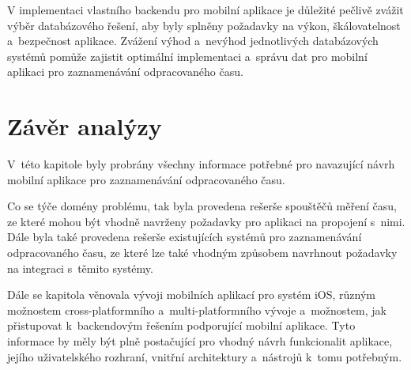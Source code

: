V implementaci vlastního backendu pro mobilní aplikace je důležité pečlivě zvážit výběr databázového řešení, aby byly splněny požadavky na výkon, škálovatelnost a~bezpečnost aplikace. Zvážení výhod a~nevýhod jednotlivých databázových systémů pomůže zajistit optimální implementaci a~správu dat pro mobilní aplikaci pro zaznamenávání odpracovaného času.

\section{Závěr analýzy}

V~této kapitole byly probrány všechny informace potřebné pro navazující návrh mobilní aplikace pro zaznamenávání odpracovaného času. 

Co se týče domény problému, tak byla provedena rešerše spouštěčů měření času, ze které mohou být vhodně navrženy požadavky pro aplikaci na propojení s~nimi. Dále byla také provedena rešerše existujících systémů pro zaznamenávání odpracovaného času, ze které lze také vhodným způsobem navrhnout požadavky na integraci s~těmito systémy.

Dále se kapitola věnovala vývoji mobilních aplikací pro systém iOS, různým možnostem cross-platformního a~multi-platformního vývoje a~možnostem, jak přistupovat k~backendovým řešením podporující mobilní aplikace. Tyto informace by měly být plně postačující pro vhodný návrh funkcionalit aplikace, jejího uživatelského rozhraní, vnitřní architektury a~nástrojů k~tomu potřebným.











































